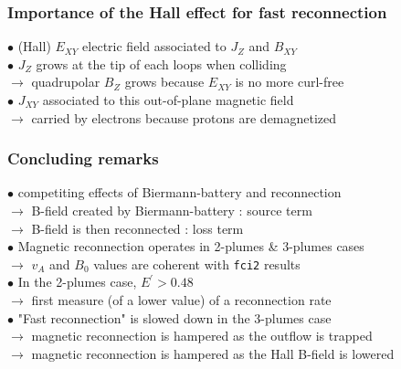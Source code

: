 \documentclass{beamer}
\begin{document}
\begin{frame}
\frametitle{Importance of the Hall effect for fast reconnection}

\begin{center}

\end{center}

$\bullet$ (Hall) $E_{XY}$ electric field associated to $J_Z$ and $B_{XY}$ \\[0.3cm]
$\bullet$ $J_Z$ grows at the tip of each loops when colliding\\
$\to$ quadrupolar $B_Z$ grows because $E_{XY}$ is no more curl-free\\[0.3cm]
$\bullet$ $J_{XY}$ associated to this out-of-plane magnetic field\\
$\to$ carried by electrons because protons are demagnetized

\end{frame}



\begin{frame}
\frametitle{Concluding remarks}

$\bullet$ competiting effects of Biermann-battery and reconnection \\
$\to$ B-field created by Biermann-battery : source term \\
$\to$ B-field is then reconnected : loss term \\[0.6cm]
$\bullet$ Magnetic reconnection operates in 2-plumes \& 3-plumes cases \\
$\to$ $v_A$ and $B_0$ values are coherent with \texttt{fci2} results \\[0.6cm]
$\bullet$ In the 2-plumes case, $E^{\prime} > 0.48$ \\
$\to$ first measure (of a lower value) of a reconnection rate \\[0.6cm]
$\bullet$ "Fast reconnection" is slowed down in the 3-plumes case \\
$\to$ magnetic reconnection is hampered as the outflow is trapped \\
$\to$ magnetic reconnection is hampered as the Hall B-field is lowered \\

\end{frame}
\end{document}

